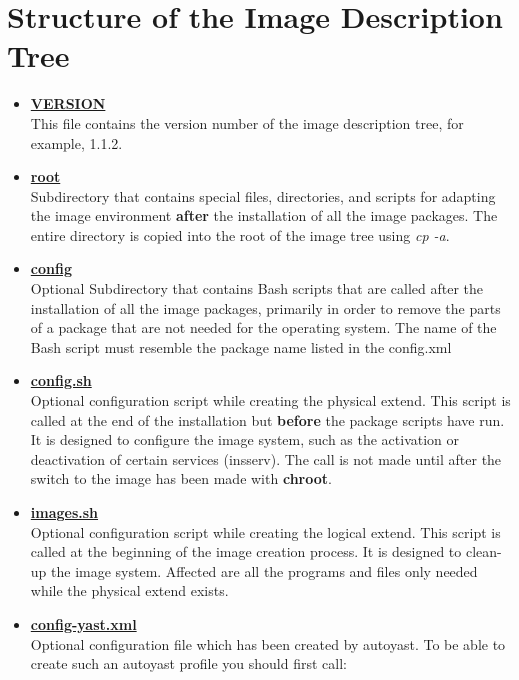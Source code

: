 \section{Structure of the Image Description Tree}
\label{imagetree}
\begin{itemize}

\item \textbf{\underline{VERSION}}\\
      This file contains the version number of the image description tree,
      for example, 1.1.2.
\item \textbf{\underline{root}}\\
      Subdirectory that contains special files, directories, and scripts for
      adapting the image environment \textbf{after} the installation of all the
      image packages. The entire directory is copied into the root of the
      image tree using \textit{cp -a}.
\item \textbf{\underline{config}}\\
      Optional Subdirectory that contains Bash scripts that are called
      after the installation of all the image packages, primarily in order
      to remove the parts of a package that are not needed for the operating
      system. The name of the Bash script must resemble the package name
      listed in the config.xml
\item \textbf{\underline{config.sh}}\\
      Optional configuration script while creating the physical extend. This
      script is called at the end of the installation but \textbf{before}
      the package scripts have run. It is designed to configure the image
      system, such as the activation or deactivation of certain services
      (insserv). The call is not made until after the switch to the image
      has been made with \textbf{chroot}.
\item \textbf{\underline{images.sh}}\\
      Optional configuration script while creating the logical extend.
      This script is called at the beginning of the image creation process.
      It is designed to clean-up the image system. Affected are all the
      programs and files only needed while the physical extend exists.
\item \textbf{\underline{config-yast.xml}}\\
      Optional configuration file which has been created by autoyast.
      To be able to create such an autoyast profile you should first
      call:


\end{itemize}
